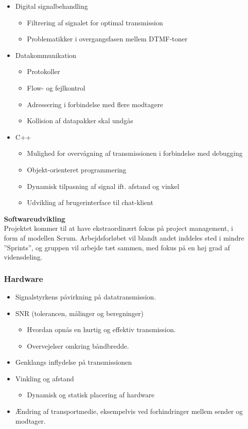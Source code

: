 \begin{itemize}[noitemsep]
  \item Digital signalbehandling
  \begin{itemize}[noitemsep]
    \item Filtrering af signalet for optimal transmission
    \item Problematikker i overgangsfasen mellem DTMF-toner
  \end{itemize}
  \item Datakommunikation
  \begin{itemize}[noitemsep]
    \item Protokoller
    \item Flow- og fejlkontrol
    \item Adressering i forbindelse med flere modtagere
    \item Kollision af datapakker skal undgås
  \end{itemize}
  \item C++
    \begin{itemize}[noitemsep]
    \item Mulighed for overvågning af transmissionen i forbindelse med debugging
    \item Objekt-orienteret programmering
    \item Dynamisk tilpasning af signal ift. afstand og vinkel
    \item Udvikling af brugerinterface til chat-klient
  \end{itemize}
\end{itemize}

\textbf{Softwareudvikling}\\
Projektet kommer til at have ekstraordinært fokus på project management, i form af modellen Scrum. Arbejdsforløbet vil blandt andet inddeles sted i mindre ”Sprints”, og gruppen vil arbejde tæt sammen, med fokus på en høj grad af vidensdeling.

\subsubsection{Hardware}

\begin{itemize}[noitemsep]
  \item Signalstyrkens påvirkning på datatransmission.
  \item SNR (tolerancen, målinger og beregninger)
  \begin{itemize}[noitemsep]
  \item Hvordan opnås en hurtig og effektiv transmission.
  \item Overvejelser omkring båndbredde.
  \end{itemize}
  \item Genklangs inflydelse på transmissionen
  \item Vinkling og afstand
  \begin{itemize}[noitemsep]
  \item Dynamisk og statisk placering af hardware
  \end{itemize}
  \item Ændring af transportmedie, eksempelvis ved forhindringer mellem sender og modtager.
\end{itemize}
